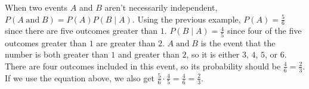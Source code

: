 \documentclass[twocolumn]{article}
\newcommand{\pand}{\mathop\text{and}}
\begin{document}
When two events $A$ and $B$ aren't necessarily independent, $P(A \pand B) = 
P(A)P(B \mid A)$. Using the previous example, $P(A) = \frac{5}{6}$ since there 
are five outcomes greater than $1$. $P(B \mid A) = \frac{4}{5}$ since four of 
the five outcomes greater than $1$ are greater than $2$. $A \pand B$ is the 
event that the number is both greater than $1$ and greater than $2$, so it is 
either $3$, $4$, $5$, or $6$. There are four outcomes included in this event, so 
its probability should be $\frac{4}{6} = \frac{2}{3}$. If we use the equation 
above, we also get $\frac{5}{6} \cdot \frac{4}{5} = \frac{4}{6} = \frac{2}{3}$.
\end{document}
